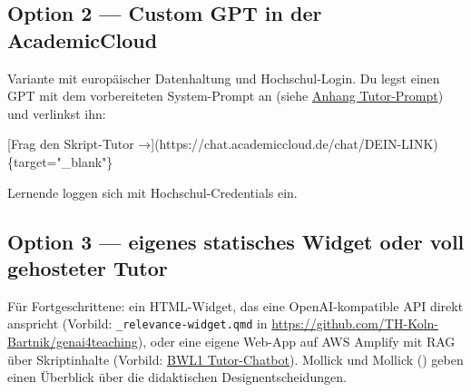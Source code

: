 \documentclass[
  ngerman,
  a4paper,
  DIV=11]{scrreprt}
\newenvironment{Shaded}{\begin{snugshade}}{\end{snugshade}}
\newcommand{\CommentTok}[1]{\textcolor[rgb]{0.37,0.37,0.37}{#1}}
\newcommand{\NormalTok}[1]{\textcolor[rgb]{0.00,0.23,0.31}{#1}}
\newcommand{\OtherTok}[1]{\textcolor[rgb]{0.00,0.23,0.31}{#1}}
\begin{document}
\subsection{Option 2 --- Custom GPT in der
AcademicCloud}\label{option-2-custom-gpt-in-der-academiccloud}

Variante mit europäischer Datenhaltung und Hochschul-Login. Du legst
einen GPT mit dem vorbereiteten System-Prompt an (siehe
\href{../appendix/tutor-prompt.qmd}{Anhang Tutor-Prompt}) und verlinkst
ihn:

\begin{Shaded}
\begin{Highlighting}[]
\CommentTok{[}\OtherTok{Frag den Skript{-}Tutor →}\CommentTok{](https://chat.academiccloud.de/chat/DEIN{-}LINK)}\NormalTok{\{target="\_blank"\}}
\end{Highlighting}
\end{Shaded}

Lernende loggen sich mit Hochschul-Credentials ein.

\subsection{Option 3 --- eigenes statisches Widget oder voll gehosteter
Tutor}\label{option-3-eigenes-statisches-widget-oder-voll-gehosteter-tutor}

Für Fortgeschrittene: ein HTML-Widget, das eine OpenAI-kompatible API
direkt anspricht (Vorbild: \texttt{\_relevance-widget.qmd} in
\url{https://github.com/TH-Koln-Bartnik/genai4teaching}), oder eine
eigene Web-App auf AWS Amplify mit RAG über Skriptinhalte (Vorbild:
\href{https://main.difctumi6okdj.amplifyapp.com/}{BWL1 Tutor-Chatbot}).
Mollick und Mollick () geben einen
Überblick über die didaktischen Designentscheidungen.
\end{document}
